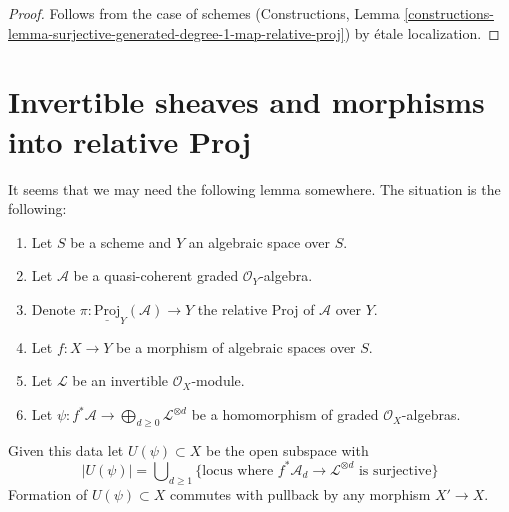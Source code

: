 \documentclass{stacks-project}
\theoremstyle{plain}
\theoremstyle{definition}
\theoremstyle{remark}
\numberwithin{equation}{subsection}
\begin{document}
\begin{proof}
Follows from the case of schemes
(Constructions, Lemma
\ref{constructions-lemma-surjective-generated-degree-1-map-relative-proj})
by \'etale localization.
\end{proof}










\section{Invertible sheaves and morphisms into relative Proj}
\label{section-invertible-relative-proj}

\noindent
It seems that we may need the following lemma somewhere.
The situation is the following:
\begin{enumerate}
\item Let $S$ be a scheme and $Y$ an algebraic space over $S$.
\item Let $\mathcal{A}$ be a quasi-coherent graded $\mathcal{O}_Y$-algebra.
\item Denote $\pi : \underline{\text{Proj}}_Y(\mathcal{A}) \to Y$ the relative
Proj of $\mathcal{A}$ over $Y$.
\item Let $f : X \to Y$ be a morphism of algebraic spaces over $S$.
\item Let $\mathcal{L}$ be an invertible $\mathcal{O}_X$-module.
\item Let
$\psi : f^*\mathcal{A} \to \bigoplus_{d \geq 0} \mathcal{L}^{\otimes d}$
be a homomorphism of graded $\mathcal{O}_X$-algebras.
\end{enumerate}
Given this data let $U(\psi) \subset X$ be the open subspace with
$$
|U(\psi)| = \bigcup\nolimits_{d \geq 1}
\{\text{locus where }f^*\mathcal{A}_d \to \mathcal{L}^{\otimes d}
\text{ is surjective}\}
$$
Formation of $U(\psi) \subset X$ commutes with
pullback by any morphism $X' \to X$.
\end{document}
